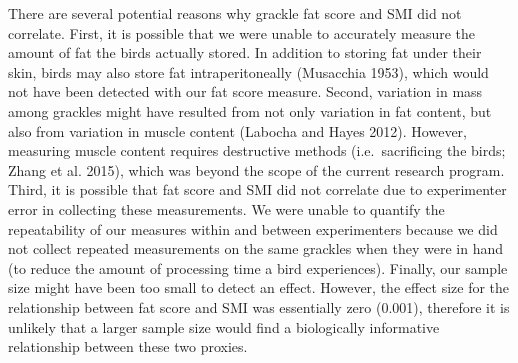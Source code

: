\documentclass[
]{article}
\begin{document}
There are several potential reasons why grackle fat score and SMI did
not correlate. First, it is possible that we were unable to accurately
measure the amount of fat the birds actually stored. In addition to
storing fat under their skin, birds may also store fat intraperitoneally
(Musacchia 1953), which would not have been detected with our fat score
measure. Second, variation in mass among grackles might have resulted
from not only variation in fat content, but also from variation in
muscle content (Labocha and Hayes 2012). However, measuring muscle
content requires destructive methods (i.e.~sacrificing the birds; Zhang
et al. 2015), which was beyond the scope of the current research
program. Third, it is possible that fat score and SMI did not correlate
due to experimenter error in collecting these measurements. We were
unable to quantify the repeatability of our measures within and between
experimenters because we did not collect repeated measurements on the
same grackles when they were in hand (to reduce the amount of processing
time a bird experiences). Finally, our sample size might have been too
small to detect an effect. However, the effect size for the relationship
between fat score and SMI was essentially zero (0.001), therefore it is
unlikely that a larger sample size would find a biologically informative
relationship between these two proxies.
\end{document}
